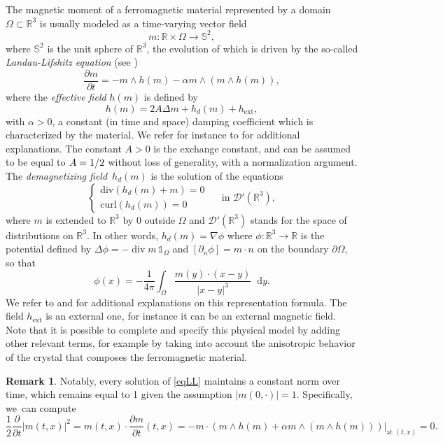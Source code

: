 \documentclass[JEP,XML,SOM,Unicode,NoEqCountersInSection,NoFloatCountersInSection,published]{cedram}
\theoremstyle{definition}
\newtheorem{remark}[theorem]{Remark}
\newcommand{\R} {\mathbb{R}}
\newcommand*\diff{\mathop{}\!\mathrm{d}}
\begin{document}
The magnetic moment of a ferromagnetic material represented by a domain $\Omega\subset\R^3$ is usually modeled as a time-varying vector field
\[
m:\R\times\Omega\to\mathbb{S}^2,
\]
where $\mathbb{S}^2$ is the unit sphere of $\R^3$, the evolution of which is driven by the so-called \emph{Landau-Lifshitz equation} (see \cite{landau2013electrodynamics})
\begin{equation}\label{eqLL}
\frac{\partial m}{\partial t}=-m\wedge h(m)-\alpha m\wedge (m\wedge h(m)),
\end{equation}
where the \emph{effective field} $h(m)$ is defined by
\[
h(m) = 2A\Delta m+h_d(m)+h_{\mathrm{ext}},
\]
with $\alpha>0$, a constant (in time and space) damping coefficient which is characterized by the material. We refer for instance to \cite{hubert2008magnetic,brown1963micromagnetics} for additional explanations.
The constant $A>0$ is the exchange constant, and can be assumed to be equal to $A=\nobreak1/2$ without loss of generality, with a normalization argument. The \textit{demagnetizing field}~$h_d(m)$ is the solution of the equations
\[
\begin{cases}
\mathrm{div}(h_d(m)+m)=0\\
\mathrm{curl}(h_d(m))=0
\end{cases}
\quad \text{ in }\mathcal{D}'(\R^3),
\]
where $m$ is extended to $\R^3$ by $0$ outside $\Omega$ and $\mathcal{D}'(\R^3)$ stands for the space of distributions on $\R^3$. In other words, $h_d(m) =\nabla \phi$ where $\phi: \R^3 \to \R$ is the potential defined by $\Delta \phi = -\operatorname{div} m \, \mathds{1}_{\Omega}$ and $[\partial_n\phi]=m\cdot n $ on the boundary $\partial\Omega$, so that
\[
\phi(x)=-\frac{1}{4\pi}\int_\Omega \frac{m(y)\cdot (x-y)}{|x-y|^3} \diff y.
\]
We refer to \cite{alouges2001computation,brown1963micromagnetics} and \cite[\S 1]{di2020variational} for additional explanations on this representation formula.
The field $h_{\mathrm{ext}}$ is an external one, for instance it can be an external magnetic field.
Note that it is possible to complete and specify this physical model by adding other relevant terms, for example by taking into account the anisotropic behavior of the crystal that composes the ferromagnetic material.

\begin{remark}
Notably, every solution of \eqref{eqLL} maintains a constant norm over time, which remains equal to 1 given the assumption $|m(0,\cdot)|=1$. Specifically, we~can compute
\[
\frac12\frac{\partial}{\partial t}|m(t,x)|^2\!=\!m(t,x)\cdot \frac{\partial m}{\partial t}(t,x)\!=\!\left.-m\cdot (m\wedge h(m)+\alpha m\wedge (m\wedge h(m)))\right|_{\text{at }(t,x)}=0.
\]
\end{remark}
\end{document}
